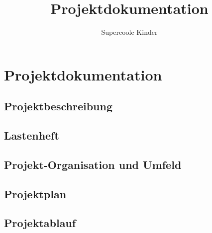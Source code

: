 \documentclass[a4paper, 12pt, titlepage]{scrartcl}
\begin{document}
\author{Supercoole Kinder}
\title{Projektdokumentation} 
\publishers{Humboldt-Universit\"at zu Berlin}
\maketitle
\tableofcontents

\section{Projektdokumentation}
	\subsection{Projektbeschreibung} %
	\subsection{Lastenheft} %
	\subsection{Projekt-Organisation und Umfeld} %
	\subsection{Projektplan} %
	\subsection{Projektablauf} %
\end{document}
